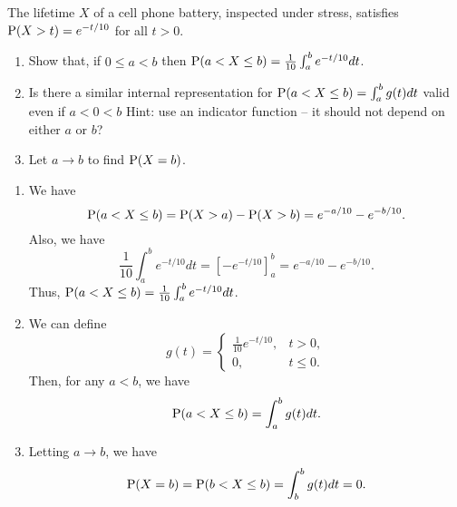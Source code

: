 \documentclass[12pt]{article}
\newcommand{\Prob}{{\rm P}}
\newenvironment{problem}[2][Problem]{\begin{trivlist}
\item[\hskip \labelsep {\bfseries #1}\hskip \labelsep {\bfseries #2.}]}
{\end{trivlist}}
\begin{document}
\begin{problem}{5} The lifetime $X$ of a cell phone battery, inspected
  under stress, satisfies\\ 
  $\Prob(X>t) = e^{-t/10}$ for all $t>0$.
  \begin{enumerate}
    \item Show that, if $0 \le a < b$ then 
    $\Prob(a < X \le b) = \frac{1}{10}\int_a^b e^{-t/10}dt$.
    \item Is there a similar internal representation for 
    $\Prob(a < X \le b) = \int_a^b g(t)dt$ valid even if $a<0<b$
    Hint: use an indicator function -- 
    it should not depend on either $a$ or $b$?
    \item Let $a \to b$ to find $\Prob(X=b)$.
  \end{enumerate}
  \begin{enumerate}
    \item We have
    \[
      \Prob(a < X \le b) = \Prob(X > a) - \Prob(X > b) = e^{-a/10} - e^{-b/10}.
    \]
    Also, we have
    \[
      \frac{1}{10}\int_a^b e^{-t/10}dt = \left[-e^{-t/10}\right]_a^b 
      = e^{-a/10} - e^{-b/10}.
    \]
    Thus, $\Prob(a < X \le b) = \frac{1}{10}\int_a^b e^{-t/10}dt$.
    \item We can define
    \[
      g(t) = \begin{cases}
        \frac{1}{10}e^{-t/10}, & t > 0,\\
        0, & t \le 0.
      \end{cases}
    \]
    Then, for any $a < b$, we have
    \[
      \Prob(a < X \le b) = \int_a^b g(t)dt.
    \]
    \item Letting $a \to b$, we have
    \[
      \Prob(X = b) = \Prob(b < X \le b) = \int_b^b g(t)dt = 0.
    \]
  \end{enumerate}
\end{problem}
\end{document}
